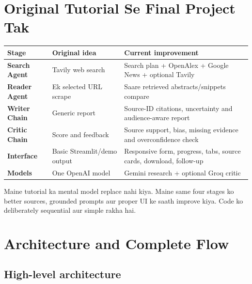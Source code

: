 \documentclass[11pt,a4paper]{article}
\begin{document}
\section{Original Tutorial Se Final Project Tak}

\begin{tabularx}{\textwidth}{>{\bfseries}p{} X X}
\toprule
Stage & Original idea & Current improvement \\
\midrule
Search Agent & Tavily web search & Search plan + OpenAlex + Google News + optional Tavily \\
Reader Agent & Ek selected URL scrape & Saare retrieved abstracts/snippets compare \\
Writer Chain & Generic report & Source-ID citations, uncertainty and audience-aware report \\
Critic Chain & Score and feedback & Source support, bias, missing evidence and overconfidence check \\
Interface & Basic Streamlit/demo output & Responsive form, progress, tabs, source cards, download, follow-up \\
Models & One OpenAI model & Gemini research + optional Groq critic \\
\bottomrule
\end{tabularx}

\begin{keybox}
Maine tutorial ka mental model replace nahi kiya. Maine same four stages ko better sources, grounded prompts aur proper UI ke saath improve kiya. Code ko deliberately sequential aur simple rakha hai.
\end{keybox}

\section{Architecture and Complete Flow}

\subsection{High-level architecture}
\end{document}
